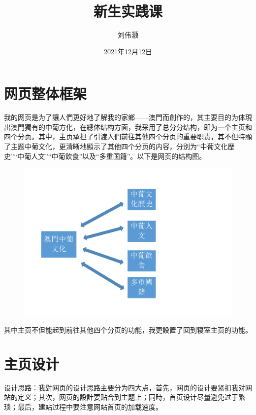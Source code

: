 \documentclass[supercite]{Experimental_Report}
\title{~~~~~~新生实践课~~~~~~}
\author{刘伟灏}
\date{2021年12月12日}
\theoremstyle{definition}
\begin{document}
	
	\maketitle
	
	\clearpage
	
	
	\tableofcontents[level=2]
	\clearpage
	
	
	\section{网页整体框架}
	我的网页是为了讓人們更好地了解我的家鄉——澳門而創作的，其主要目的为体現出澳門獨有的中葡方化，在總体结构方面，我采用了总分分结构，即为一个主页和四个分页。其中，主页承担了引渡人們前往其他四个分页的重要职责，其不但特顯了主题中葡文化，更清晰地顯示了其他四个分页的内容，分别为“中葡文化歷史”“中葡人文”“中葡飲食”以及“多重国籍”。以下是网页的结构图。
	
	\begin{figure}[htb] %
		\begin{center}
			\includegraphics[scale=0.7]{images/1-1.pdf}
			\label{fig1-1}
		\end{center}
	\end{figure}
	其中主页不但能起到前往其他四个分页的功能，我更設置了回到寝室主页的功能。
	\newpage
	
	\section{主页设计}
	设计思路：我對网页的设计思路主要分为四大点，首先，网页的设计要紧扣我对网站的定义；其次，网页的設計要贴合到主题上；同時，首页设计尽量避免过于繁琐；最后，建站过程中要注意网站首页的加载速度。
	
\end{document}
